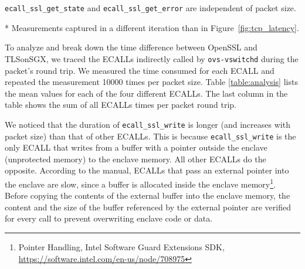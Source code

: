 {\begin{table}[t] %
	\centering
	\small
	\caption{Analysis of packet latency (all measurements are in milliseconds**)}
	\label{table:analysis}
	\setlength{\tabcolsep}{2pt}
	\raggedright {\textsf{\footnotesize* \texttt{ecall\_ssl\_get\_state} and \texttt{ecall\_ssl\_get\_error} are independent of packet size.}} \\
	\raggedright {\textsf{\footnotesize** Measurements captured in a different iteration than in Figure~\ref{fig:tcp_latency}.}}
\end{table}

To analyze and break down the time difference between OpenSSL and TLSonSGX, we traced the ECALLs indirectly called by \texttt{ovs-vswitchd} during the packet's round trip.
We measured the time consumed for each ECALL and repeated the measurement 10000 times per packet size.
Table \ref{table:analysis} lists the mean values for each of the four different ECALLs.
The last column in the table shows the sum of all ECALLs times per packet round trip. %

We noticed that the duration of \texttt{ecall\_ssl\_write} is longer (and increases with packet size) than that of other ECALLs. 
This is because \texttt{ecall\_ssl\_write} is the only ECALL that writes from a buffer with a pointer outside the enclave (unprotected memory) to the enclave memory. 
All other ECALLs do the opposite. 
According to the manual, ECALLs that pass an external pointer into the enclave are slow, since a buffer is allocated inside the enclave memory\footnote{
Pointer Handling, {Intel {Software Guard Extensions SDK}}, \url{https://software.intel.com/en-us/node/708975}}. 
Before copying the contents of the external buffer into the enclave memory, the content and the size of the buffer referenced by the external pointer are verified for every call to prevent overwriting enclave code or data.

}
